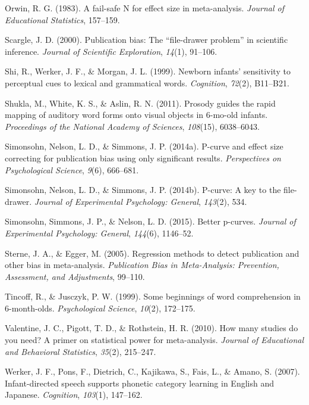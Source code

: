 \documentclass[english,floatsintext,man]{apa6}
\theoremstyle{definition}
\theoremstyle{definition}
\theoremstyle{remark}
\begin{document}
\hypertarget{ref-orwin1983fail}{}
Orwin, R. G. (1983). A fail-safe N for effect size in meta-analysis.
\emph{Journal of Educational Statistics}, 157--159.

\hypertarget{ref-scargle1999publication}{}
Scargle, J. D. (2000). Publication bias: The ``file-drawer problem'' in
scientific inference. \emph{Journal of Scientific Exploration},
\emph{14}(1), 91--106.

\hypertarget{ref-shi1999newborn}{}
Shi, R., Werker, J. F., \& Morgan, J. L. (1999). Newborn infants'
sensitivity to perceptual cues to lexical and grammatical words.
\emph{Cognition}, \emph{72}(2), B11--B21.

\hypertarget{ref-shukla2011prosody}{}
Shukla, M., White, K. S., \& Aslin, R. N. (2011). Prosody guides the
rapid mapping of auditory word forms onto visual objects in 6-mo-old
infants. \emph{Proceedings of the National Academy of Sciences},
\emph{108}(15), 6038--6043.

\hypertarget{ref-simonsohn2014power}{}
Simonsohn, Nelson, L. D., \& Simmons, J. P. (2014a). P-curve and effect
size correcting for publication bias using only significant results.
\emph{Perspectives on Psychological Science}, \emph{9}(6), 666--681.

\hypertarget{ref-simonsohn2014p}{}
Simonsohn, Nelson, L. D., \& Simmons, J. P. (2014b). P-curve: A key to
the file-drawer. \emph{Journal of Experimental Psychology: General},
\emph{143}(2), 534.

\hypertarget{ref-simonsohn2015better}{}
Simonsohn, Simmons, J. P., \& Nelson, L. D. (2015). Better p-curves.
\emph{Journal of Experimental Psychology: General}, \emph{144}(6),
1146--52.

\hypertarget{ref-sterne2005regression}{}
Sterne, J. A., \& Egger, M. (2005). Regression methods to detect
publication and other bias in meta-analysis. \emph{Publication Bias in
Meta-Analysis: Prevention, Assessment, and Adjustments}, 99--110.

\hypertarget{ref-tincoff1999some}{}
Tincoff, R., \& Jusczyk, P. W. (1999). Some beginnings of word
comprehension in 6-month-olds. \emph{Psychological Science},
\emph{10}(2), 172--175.

\hypertarget{ref-valentine2010many}{}
Valentine, J. C., Pigott, T. D., \& Rothstein, H. R. (2010). How many
studies do you need? A primer on statistical power for meta-analysis.
\emph{Journal of Educational and Behavioral Statistics}, \emph{35}(2),
215--247.

\hypertarget{ref-werker2007infant}{}
Werker, J. F., Pons, F., Dietrich, C., Kajikawa, S., Fais, L., \& Amano,
S. (2007). Infant-directed speech supports phonetic category learning in
English and Japanese. \emph{Cognition}, \emph{103}(1), 147--162.
\end{document}
